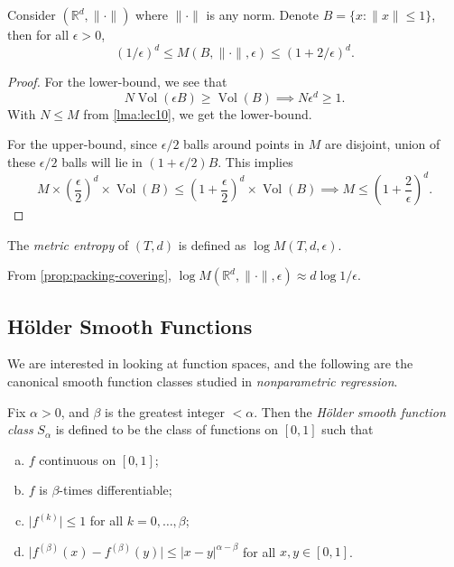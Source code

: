 \begin{proposition}\label{prop:packing-covering}
	Consider \((\mathbb{R} ^d, \lVert \cdot \rVert )\) where \(\lVert \cdot \rVert \) is any norm. Denote \(B = \{ x \colon \lVert x \rVert \leq 1 \} \), then for all \(\epsilon > 0\),
	\[
		(1 / \epsilon) ^d \leq M(B, \lVert \cdot \rVert , \epsilon ) \leq (1 + 2 / \epsilon )^d.
	\]
\end{proposition}
\begin{proof}
	For the lower-bound, we see that
	\[
		N \mathop{\mathrm{Vol}}(\epsilon B) \geq \mathop{\mathrm{Vol}}(B)
		\implies N \epsilon ^d \geq 1.
	\]
	With \(N \leq M\) from \autoref{lma:lec10}, we get the lower-bound.

	For the upper-bound, since \(\epsilon / 2\) balls around points in \(M\) are disjoint, union of these \(\epsilon / 2\) balls will lie in \((1 + \epsilon / 2)B\). This implies
	\[
		M \times \left( \frac{\epsilon}{2} \right) ^d \times \mathop{\mathrm{Vol}}(B)
		\leq \left( 1 + \frac{\epsilon}{2} \right) ^d \times \mathop{\mathrm{Vol}}(B)
		\implies M \leq \left( 1 + \frac{2}{\epsilon } \right) ^d.
	\]
\end{proof}

\begin{definition}\label{def:metric-entropy}
	The \emph{metric entropy} of \((T, d)\) is defined as \(\log M(T, d, \epsilon )\).
\end{definition}

\begin{note}
	From \autoref{prop:packing-covering}, \(\log M(\mathbb{R} ^d, \lVert \cdot \rVert , \epsilon ) \approx d \log 1 / \epsilon \).
\end{note}

\subsection{Hölder Smooth Functions}
We are interested in looking at function spaces, and the following are the canonical smooth function classes studied in \emph{nonparametric regression}.

\begin{definition}\label{def:Holder-smooth-function-class}
	Fix \(\alpha > 0\), and \(\beta \) is the greatest integer \(< \alpha \). Then the \emph{Hölder smooth function class} \(S_\alpha \) is defined to be the class of functions on \([0, 1]\) such that
	\begin{enumerate}[(a)]
		\item \(f\) continuous on \([0, 1]\);
		\item \(f\) is \(\beta \)-times differentiable;
		\item \(\vert f^{(k)} \vert \leq 1\) for all \(k = 0, \dots , \beta \);
		\item \(\vert f^{(\beta )}(x) - f^{(\beta )}(y) \vert \leq \vert x - y \vert ^{\alpha - \beta }\) for all \(x, y \in [0, 1]\).
	\end{enumerate}
\end{definition}

